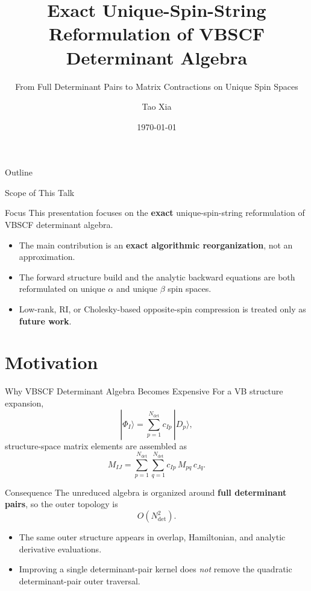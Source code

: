 \documentclass{beamer}
\title{Exact Unique-Spin-String Reformulation of VBSCF Determinant Algebra}
\subtitle{From Full Determinant Pairs to Matrix Contractions on Unique Spin Spaces}
\author{Tao Xia}
\institute{Xiamen University}
\date{\today}
\newcommand{\Dfull}{N_{\mathrm{det}}}
\begin{document}
\maketitle

\begin{frame}{Outline}
  \tableofcontents
\end{frame}

\begin{frame}{Scope of This Talk}
  \begin{block}{Focus}
    This presentation focuses on the \textbf{exact} unique-spin-string
    reformulation of VBSCF determinant algebra.
  \end{block}

  \begin{itemize}
    \item The main contribution is an \textbf{exact algorithmic reorganization},
          not an approximation.
    \item The forward structure build and the analytic backward equations are
          both reformulated on unique $\alpha$ and unique $\beta$ spin spaces.
    \item Low-rank, RI, or Cholesky-based opposite-spin compression is treated
          only as \textbf{future work}.
  \end{itemize}
\end{frame}

\section{Motivation}

\begin{frame}{Why VBSCF Determinant Algebra Becomes Expensive}
  For a VB structure expansion,
  \[
  |\Phi_I\rangle = \sum_{p=1}^{\Dfull} c_{Ip}\, |D_p\rangle,
  \]
  structure-space matrix elements are assembled as
  \[
  M_{IJ}
  =
  \sum_{p=1}^{\Dfull}
  \sum_{q=1}^{\Dfull}
  c_{Ip}\, M_{pq}\, c_{Jq}.
  \]

  \begin{block}{Consequence}
    The unreduced algebra is organized around \textbf{full determinant pairs},
    so the outer topology is
    \[
    O(\Dfull^2).
    \]
  \end{block}

  \begin{itemize}
    \item The same outer structure appears in overlap, Hamiltonian, and
          analytic derivative evaluations.
    \item Improving a single determinant-pair kernel does \emph{not} remove the
          quadratic determinant-pair outer traversal.
  \end{itemize}
\end{frame}
\end{document}
